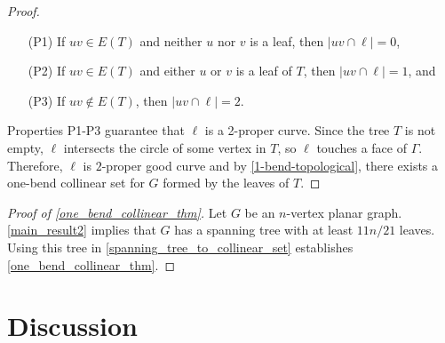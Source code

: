 \documentclass{article}
\newcommand{\pat}[1]{\textcolor{red}{PM: #1}}
\newtheorem{thm}{Theorem}
\theoremstyle{definition}
\begin{document}
\begin{proof}
    \begin{enumerate}
        \item [(P1)] If $uv \in E(T)$ and neither $u$ nor $v$ is a leaf, then $|uv \cap \ell| = 0$,

        \item [(P2)] If $uv \in E(T)$ and either $u$ or $v$ is a leaf of $T$, then $|uv \cap \ell| = 1$, and

        \item [(P3)] If $uv \notin E(T)$, then $|uv \cap \ell| = 2$.
    \end{enumerate}

    Properties P1-P3 guarantee that $\ell$ is a 2-proper curve. Since the tree $T$ is not empty, $\ell$ intersects the circle of some vertex in $T$, so $\ell$ touches a face of $\Gamma$. Therefore, $\ell$ is $2$-proper good curve and by \cref{1-bend-topological}, there exists a one-bend collinear set for $G$ formed by the leaves of $T$.
\end{proof}

\begin{proof}[Proof of \cref{one_bend_collinear_thm}]
Let $G$ be an $n$-vertex planar graph. \cref{main_result2} implies that $G$ has a spanning tree with at least $11n/21$ leaves. Using this tree in \cref{spanning_tree_to_collinear_set} establishes \cref{one_bend_collinear_thm}.
\end{proof}

\section{Discussion}
\label{discussion}



\end{document}
